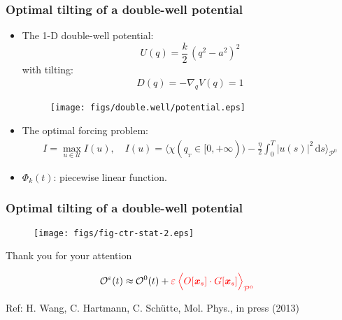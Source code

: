 \documentclass[fleqn]{beamer}
\newcommand{\redc}[1]{{\color{red} #1}}
\newcommand{\bluec}[1]{{\color{blue} #1}}
\newcommand{\vect}[1]{\textbf{\textit{#1}}}
\newcommand{\dd}[0]{\textrm{d}}
\newcommand{\eps}{\varepsilon}
\newcommand{\mo}{\mathcal O}
\newcommand{\pathmeas}{\mathcal P}
\begin{document}
\begin{frame}
  \frametitle{Optimal tilting of a double-well potential}
  \begin{itemize}
  \item<1-> 
    \begin{minipage}[t]{0.6\linewidth}
      The 1-D double-well potential:
      \bluec{
        \begin{equation*}
          U(q) = \frac k2\, (q^2 - a^2)^2
        \end{equation*}
      }
      with tilting:
      \bluec{
        \begin{align*}
          D(q) = -\nabla_q V(q) = 1
        \end{align*}
      }
    \end{minipage}
    \hfill
    \begin{minipage}[t]{0.350\linewidth}
      \begin{figure}
        \centering
        \texttt{[image: figs/double.well/potential.eps]}
      \end{figure}
    \end{minipage}
    \hfill
  \item<2-> The optimal forcing problem:
    \bluec{
      \begin{align*}
        I = \max_{u\in\mathcal U} I(u), \quad
        I(u) =
        \bigg\langle
        \chi(q_{_T}\in [0,+\infty)) - \frac\eta 2\int_0^T\vert u(s)\vert^2\,\dd s
        \bigg\rangle_{\pathmeas^0}
      \end{align*}
    }
  \item<3-> \bluec{$\Phi_k(t)$}: piecewise linear function.
  \end{itemize}
\end{frame}


\begin{frame}
  \frametitle{Optimal tilting of a double-well potential}
  \begin{figure}
    \centering
    \texttt{[image: figs/fig-ctr-stat-2.eps]}
  \end{figure}
\end{frame}




\begin{frame}
  \vskip 1.5cm
  \centerline{\bluec{\Huge Thank you for your attention}}
  \vskip 1cm
  \Large{
  \bluec{
    \begin{ceqn}
    \begin{align*}
      \mo^\eps(t) \approx\: & \mo^0(t)
      +
      \redc{\eps\:
        \Big\langle
        O[\vect x_s]\cdot G[\vect x_s]
        \Big\rangle_{\pathmeas^0}}
    \end{align*}
  \end{ceqn}
}
}
\vskip 1.5cm
\bluec{\small
Ref: H. Wang, C. Hartmann, C. Sch\"utte, Mol. Phys., in press (2013)
}
\end{frame}
\end{document}
